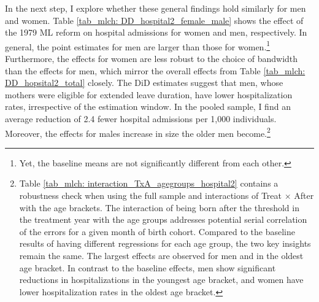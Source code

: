 \afterpage{

} 
 


 

In the next step, I explore whether these general findings hold similarly for men and women. Table \ref{tab_mlch: DD_hospital2_female_male} shows the effect of the 1979 ML reform on hospital admissions for women and men, respectively. In general, the point estimates for men are larger than those for women.\footnote{Yet, the baseline means are not significantly different from each other.} Furthermore, the effects for women are less robust to the choice of bandwidth than the effects for men, which mirror the overall effects from Table \ref{tab_mlch: DD_hopsital2_total} closely. The DiD estimates suggest that men, whose mothers were eligible for extended leave duration, have lower hospitalization rates, irrespective of the estimation window. In the pooled sample, I find an average reduction of 2.4 fewer hospital admissions per 1,000 individuals. Moreover, the effects for males increase in size the older men become.\footnote{Table \ref{tab_mlch: interaction_TxA_agegroups_hospital2} contains a robustness check when using the full sample and interactions of Treat $\times$ After with the age brackets. The interaction of being born after the threshold in the treatment year with the age groups addresses potential serial correlation of the errors for a given month of birth cohort. Compared to the baseline results of having different regressions for each age group, the two key insights remain the same. The largest effects are observed for men and in the oldest age bracket. In contrast to the baseline effects, men show significant reductions in hospitalizations in the youngest age bracket, and women have lower hospitalization rates in the oldest age bracket.} 




